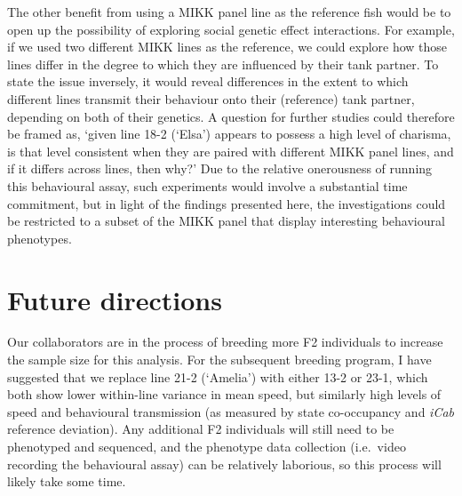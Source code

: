 \documentclass[
]{book}
\begin{document}
The other benefit from using a MIKK panel line as the reference fish would be to open up the possibility of exploring social genetic effect interactions. For example, if we used two different MIKK lines as the reference, we could explore how those lines differ in the degree to which they are influenced by their tank partner. To state the issue inversely, it would reveal differences in the extent to which different lines transmit their behaviour onto their (reference) tank partner, depending on both of their genetics. A question for further studies could therefore be framed as, `given line \textcolor{18-2 (‘Elsa’)_FF66A6}{18-2 (‘Elsa’)} appears to possess a high level of charisma, is that level consistent when they are paired with different MIKK panel lines, and if it differs across lines, then why?' Due to the relative onerousness of running this behavioural assay, such experiments would involve a substantial time commitment, but in light of the findings presented here, the investigations could be restricted to a subset of the MIKK panel that display interesting behavioural phenotypes.

\hypertarget{future-directions}{%
\section{Future directions}\label{future-directions}}

Our collaborators are in the process of breeding more F2 individuals to increase the sample size for this analysis. For the subsequent breeding program, I have suggested that we replace line \textcolor{21-2 (‘Amelia’)_49B500}{21-2 (‘Amelia’)} with either \textcolor{13-2_F57A5F}{13-2} or \textcolor{23-1_AFA200}{23-1}, which both show lower within-line variance in mean speed, but similarly high levels of speed and behavioural transmission (as measured by state co-occupancy and \emph{\textcolor{iCab_424B4D}{iCab}} reference deviation). Any additional F2 individuals will still need to be phenotyped and sequenced, and the phenotype data collection (i.e.~video recording the behavioural assay) can be relatively laborious, so this process will likely take some time.
\end{document}
